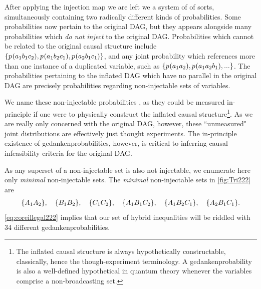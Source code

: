After applying the injection map  we are left we a system of  of sorts, simultaneously containing two radically different kinds of probabilities. Some probabilities now pertain to the original DAG, but they appears alongside many probabilities which \emph{do not inject} to the original DAG. Probabilities which cannot be related to the original causal structure include $\{{p_{}}\lparen a_1 b_1 c_2\rparen,{p_{}}\lparen a_1 b_2 c_1\rparen,{p_{}}\lparen a_2 b_1 c_1\rparen\}$, and any joint probability which references more than one instance of a duplicated variable, such as $\{{p_{}}\lparen a_1 a_2\rparen,{p_{}}\lparen a_1 a_2 b_1\rparen,...\}$. The probabilities pertaining to the inflated DAG which have no parallel in the original DAG are precisely probabilities regarding non-injectable sets of variables.

We name these non-injectable probabilities , as they could be measured in-principle if one were to physically construct the inflated causal structure\footnote{The inflated causal structure is always hypothetically constructable, classically, hence the though-experiment terminology. A gedankenprobability is also a well-defined hypothetical in quantum theory whenever the variables comprise a non-broadcasting set.}. As we are really only concerned with the original DAG, however, these ``unmeasured" joint distributions are effectively just thought experiments. The in-principle existence of gedankenprobabilities, however, is critical to inferring causal infeasibility criteria for the original DAG. 

As any superset of a non-injectable set is also not injectable, we enumerate here only \emph{minimal} non-injectable sets. The \emph{minimal} non-injectable sets in \cref{fig:Tri222} are
\begin{align}\label{eq:coreillegal222}
    \brackets{A_1 A_2},\quad\brackets{B_1 B_2},\quad\brackets{C_1 C_2},\quad\brackets{A_1 B_1 C_2},\quad\brackets{A_1 B_2 C_1},\quad\brackets{A_2 B_1 C_1}.
\end{align}
\cref{eq:coreillegal222} implies that our set of hybrid inequalities will be riddled with 34 different gedankenprobabilities.


